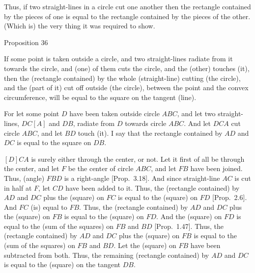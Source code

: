 Thus, if two straight-lines in a circle cut one another then the rectangle
contained by the pieces of one is equal to the rectangle contained
by the pieces of the other. (Which is) the very thing it was required to
show.


\begin{center}
{\large Proposition 36}\end{center}

If some point is taken outside a circle, and  two straight-lines
radiate from it towards the circle, and (one) of them cuts the circle, and the (other)
touches (it), then the (rectangle contained) by the whole  (straight-line) cutting (the circle), and the (part of it) 
cut off outside (the circle),
between the point and the convex circumference, will be equal to the
square on the tangent (line).

\epsfysize=1.8in
\centerline{}

For let some point $D$ have been taken outside circle $ABC$, and let two
straight-lines, $DC[A]$ and $DB$, radiate from $D$ towards circle $ABC$. And
let $DCA$ cut circle $ABC$, and let $BD$ touch (it). I say that the rectangle
contained by $AD$ and $DC$ is equal to the square on $DB$.

$[D]CA$ is surely either through the center, or not. Let it first of all be
through the center, and let $F$ be the center of circle $ABC$, and let 
$FB$ have been joined. Thus, (angle) $FBD$ is a right-angle [Prop.~3.18].
And since straight-line $AC$ is cut in half at $F$, let $CD$ have been added to it.
Thus, the (rectangle contained) by $AD$ and $DC$ plus the (square) on $FC$ is
equal to the (square) on $FD$ [Prop.~2.6]. And $FC$ (is) equal to $FB$.
Thus, the (rectangle contained) by $AD$ and $DC$ plus the (square) on $FB$
is equal to the (square) on $FD$. And the (square) on $FD$ is equal to
the (sum of the squares) on $FB$ and $BD$ [Prop.~1.47]. Thus, the
(rectangle contained) by $AD$ and $DC$ plus the (square) on $FB$ is equal
to the (sum of the squares) on $FB$ and $BD$. Let the (square) on $FB$ have been subtracted
from both. Thus, the remaining (rectangle contained) by $AD$ and $DC$ 
is equal to the (square) on the tangent $DB$.

